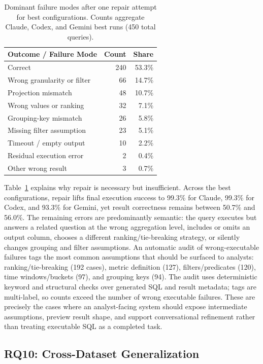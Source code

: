\documentclass[sigconf, nonacm]{acmart}
\begin{document}
\begin{table}[t]
\caption{Dominant failure modes after one repair attempt for best configurations. Counts aggregate Claude, Codex, and Gemini best runs (450 total queries).}
\label{tab:failure-modes}
\centering
\small
\begin{tabular}{lrr}
\toprule
\textbf{Outcome / Failure Mode} & \textbf{Count} & \textbf{Share} \\
\midrule
Correct & 240 & 53.3\% \\
Wrong granularity or filter & 66 & 14.7\% \\
Projection mismatch & 48 & 10.7\% \\
Wrong values or ranking & 32 & 7.1\% \\
Grouping-key mismatch & 26 & 5.8\% \\
Missing filter assumption & 23 & 5.1\% \\
Timeout / empty output & 10 & 2.2\% \\
Residual execution error & 2 & 0.4\% \\
Other wrong result & 3 & 0.7\% \\
\bottomrule
\end{tabular}
\end{table}

Table~\ref{tab:failure-modes} explains why repair is necessary but insufficient. Across the best configurations, repair lifts final execution success to 99.3\% for Claude, 99.3\% for Codex, and 93.3\% for Gemini, yet result correctness remains between 50.7\% and 56.0\%. The remaining errors are predominantly semantic: the query executes but answers a related question at the wrong aggregation level, includes or omits an output column, chooses a different ranking/tie-breaking strategy, or silently changes grouping and filter assumptions. An automatic audit of wrong-executable failures tags the most common assumptions that should be surfaced to analysts: ranking/tie-breaking (192 cases), metric definition (127), filters/predicates (120), time windows/buckets (97), and grouping keys (94). The audit uses deterministic keyword and structural checks over generated SQL and result metadata; tags are multi-label, so counts exceed the number of wrong executable failures. These are precisely the cases where an analyst-facing system should expose intermediate assumptions, preview result shape, and support conversational refinement rather than treating executable SQL as a completed task.

\subsection{RQ10: Cross-Dataset Generalization}
\label{sec:crossdataset}
\end{document}
